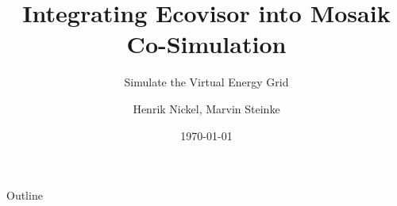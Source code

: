 \documentclass[aspectratio=169, 10pt]{beamer}
\title[Ecovisor \& Mosaik Co-Simulation]{
    Integrating Ecovisor into Mosaik Co-Simulation
}
\subtitle{Simulate the Virtual Energy Grid}
\author[Nickel \& Steinke]{Henrik Nickel, Marvin Steinke}
\institute{Technische Universität Berlin}
\date{\today}
\begin{document}
\frame[plain]{\titlepage}
\begin{frame}{Outline}
    \tableofcontents
\end{frame}
\end{document}
